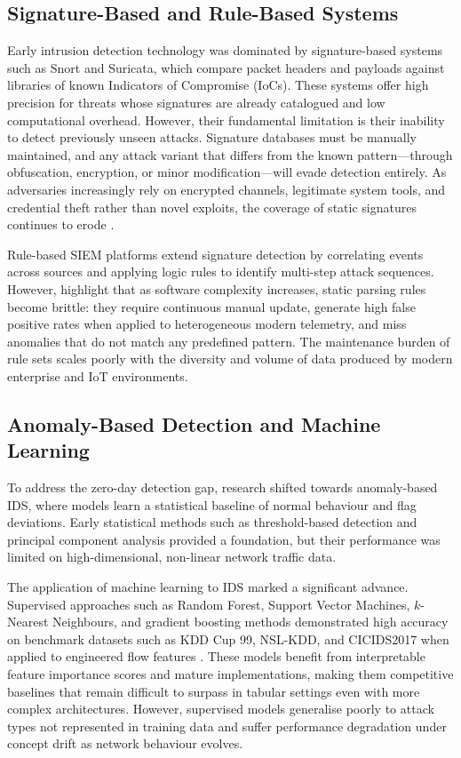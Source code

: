 \documentclass[12pt,a4paper]{report}
\begin{document}
\subsection{Signature-Based and Rule-Based Systems}
\label{sec:signature}

Early intrusion detection technology was dominated by signature-based systems such as Snort and Suricata, which compare packet headers and payloads against libraries of known Indicators of Compromise (IoCs). These systems offer high precision for threats whose signatures are already catalogued and low computational overhead. However, their fundamental limitation is their inability to detect previously unseen attacks. Signature databases must be manually maintained, and any attack variant that differs from the known pattern---through obfuscation, encryption, or minor modification---will evade detection entirely. As adversaries increasingly rely on encrypted channels, legitimate system tools, and credential theft rather than novel exploits, the coverage of static signatures continues to erode \citep{ahmad2021}.

Rule-based SIEM platforms extend signature detection by correlating events across sources and applying logic rules to identify multi-step attack sequences. However, \citet{zhu2023} highlight that as software complexity increases, static parsing rules become brittle: they require continuous manual update, generate high false positive rates when applied to heterogeneous modern telemetry, and miss anomalies that do not match any predefined pattern. The maintenance burden of rule sets scales poorly with the diversity and volume of data produced by modern enterprise and IoT environments.

\subsection{Anomaly-Based Detection and Machine Learning}
\label{sec:anomaly}

To address the zero-day detection gap, research shifted towards anomaly-based IDS, where models learn a statistical baseline of normal behaviour and flag deviations. Early statistical methods such as threshold-based detection and principal component analysis provided a foundation, but their performance was limited on high-dimensional, non-linear network traffic data.

The application of machine learning to IDS marked a significant advance. Supervised approaches such as Random Forest, Support Vector Machines, $k$-Nearest Neighbours, and gradient boosting methods demonstrated high accuracy on benchmark datasets such as KDD Cup 99, NSL-KDD, and CICIDS2017 when applied to engineered flow features \citep{aldweesh2020}. These models benefit from interpretable feature importance scores and mature implementations, making them competitive baselines that remain difficult to surpass in tabular settings even with more complex architectures. However, supervised models generalise poorly to attack types not represented in training data and suffer performance degradation under concept drift as network behaviour evolves.
\end{document}
